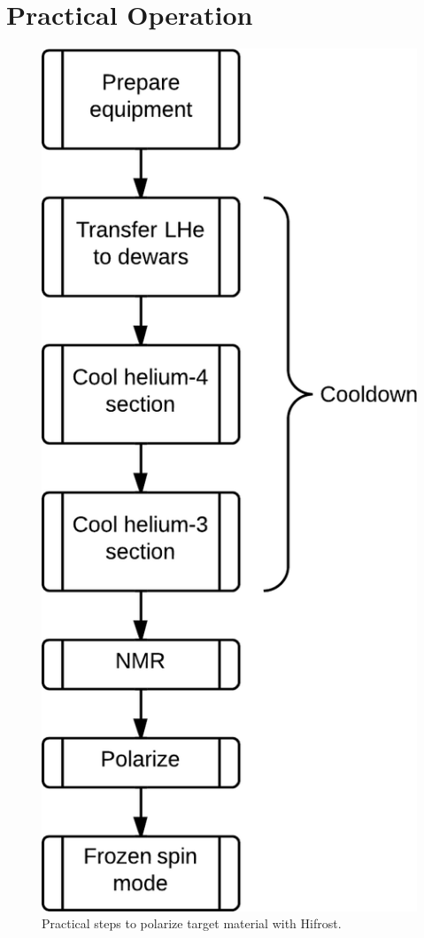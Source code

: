 \chapter{Practical Operation} 
\label{chapter:practical-op}
\begin{figure}[!h]
 \centering
 \includegraphics[scale=.24]{./img/cooldown-overview-flowchart.png}
 \caption{Practical steps to polarize target material with Hifrost.}
 \label{fig:cooldown-overview-flowchart}
\end{figure}

